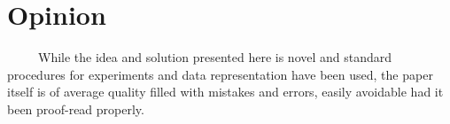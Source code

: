 \documentclass[twoside,twocolumn]{article}
\begin{document}
\section{Opinion}
~~~~~While the idea and solution presented here is novel and standard procedures for experiments and data representation have been used, the paper itself is of average quality filled with mistakes and errors, easily avoidable had it been proof-read properly.
%
\end{document}
